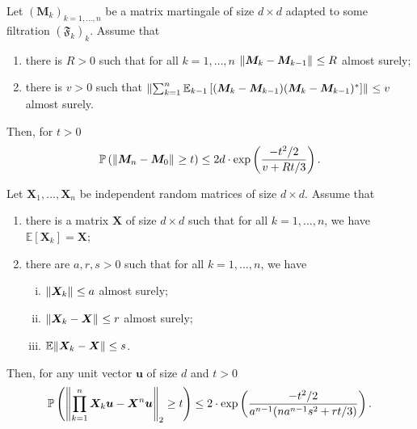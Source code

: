 \begin{lem}
  \label{freedman}
    Let \( \left(\bm{M}_k \right)_{k=1,\dots,n}  \) be a matrix martingale of size \( d \times d \) adapted to some filtration \( (\mathfrak{F}_k)_k \). Assume that 
    \begin{enumerate}[1)]
      \item there is \( R >0 \) such that for all \( k= 1, \dots, n \) \( \norm{\bm{M}_k-\bm{M}_{k-1}}_{} \leq R\) almost surely;
      \item there is \( v > 0 \) such that \( \norm{\sum_{k=1}^{n}\mathbb{E}_{k-1}\left[(\bm{M}_k-\bm{M}_{k-1})(\bm{M}_k-\bm{M}_{k-1})^{*}\right]}_{} \leq v \) almost surely. 
    \end{enumerate}
    Then, for \( t >0 \)
    \[ \mathbb{P}\left(\norm{\bm{M}_n-\bm{M}_0}_{} \geq t\right) \leq 2d \cdot \operatorname{exp}\left( \frac{-t^{2}/2}{ v+ Rt/3}\right) .\]
\end{lem}


\begin{thm}
    \label{avgprodconc}
    Let \( \bm{X}_1, \dots, \bm{X}_n \) be independent random matrices of size \( d \times d \). Assume that 
    \begin{enumerate}[1)]
      \item there is a matrix \( \bm{X} \) of size \( d\times d \) such that for all \( k=1, \dots, n \), we have \(\mathbb{E}\left[\bm{X}_k\right]=\bm{X}\);
      \item there are \( a,r,s >0 \) such that for all \( k=1,\dots, n \), we have 
        \begin{enumerate}[i)]
          \item \( \norm{\bm{X}_k}_{} \leq a \) almost surely;
          \item \( \norm{\bm{X}_k-\bm{X}}_{} \leq r\) almost surely;
          \item \( \mathbb{E}\norm{\bm{X}_k-\bm{X}} \leq s \).
        \end{enumerate}
            \end{enumerate}
            Then, for any unit vector \( \bm{u} \) of size \( d \) and \( t >0 \)
            \[ \mathbb{P}\left(\norm{\prod_{k=1}^{n}\bm{X}_k\bm{u}- \bm{X}^{n}\bm{u}}_{2} \geq t\right) \leq 2 \cdot \operatorname{exp}\left(\frac{-t^2/2}{a^{n-1}(na^{n-1}s^2+rt/3)}\right).
 \]
\end{thm}

